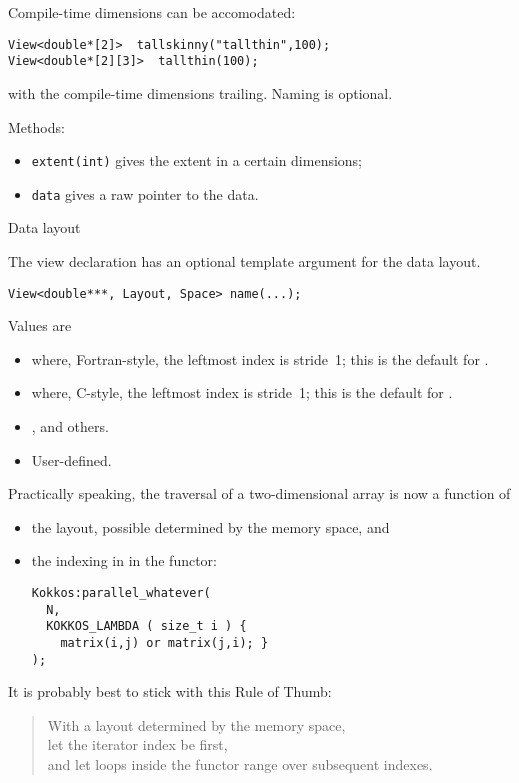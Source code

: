 Compile-time dimensions can be accomodated:
\begin{lstlisting}
View<double*[2]>  tallskinny("tallthin",100);
View<double*[2][3]>  tallthin(100);
\end{lstlisting}
with the compile-time dimensions trailing. Naming is optional.

Methods:
\begin{itemize}
\item \lstinline{extent(int)} gives the extent in a certain dimensions;
\item \lstinline{data} gives a raw pointer to the data.
\end{itemize}

 {Data layout}

The view declaration has an optional template argument for the data layout.
\begin{lstlisting}
View<double***, Layout, Space> name(...);
\end{lstlisting}
Values are 
\begin{itemize}
\item {} where, Fortran-style, the leftmost index is stride~1;
  this is the default for .
\item {} where, C-style, the leftmost index is stride~1;
  this is the default for .
\item {},  and others.
\item User-defined.
\end{itemize}

Practically speaking, the traversal of a two-dimensional array is now a function of 
\begin{itemize}
\item the layout, possible determined by the memory space, and
\item the indexing in in the functor:
\begin{lstlisting}
Kokkos:parallel_whatever(
  N,
  KOKKOS_LAMBDA ( size_t i ) {
    matrix(i,j) or matrix(j,i); }
);
\end{lstlisting}
\end{itemize}
It is probably best to stick with this Rule of Thumb:
\begin{quotation}
  With a layout determined by the memory space,\\
  let the iterator index be first,\\
  and let loops inside the functor range over subsequent indexes.
\end{quotation}

